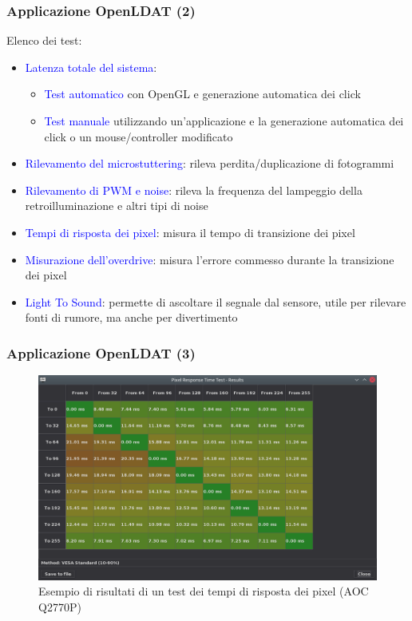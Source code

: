 \documentclass{beamer}
\begin{document}
\begin{frame}[shrink=7]
	\frametitle{Applicazione OpenLDAT (2)}
	Elenco dei test:\begin{itemize}
		\item \textcolor{blue}{Latenza totale del sistema}:\begin{itemize}
			\item \textcolor{blue}{Test automatico} con OpenGL e generazione automatica dei click
			\item \textcolor{blue}{Test manuale} utilizzando un'applicazione e la generazione automatica dei click o un mouse/controller modificato
		\end{itemize}
		\item \textcolor{blue}{Rilevamento del microstuttering}: rileva perdita/duplicazione di fotogrammi
		\item \textcolor{blue}{Rilevamento di PWM e noise}: rileva la frequenza del lampeggio della retroilluminazione e altri tipi di noise
		\item \textcolor{blue}{Tempi di risposta dei pixel}: misura il tempo di transizione dei pixel
		\item \textcolor{blue}{Misurazione dell'overdrive}: misura l'errore commesso durante la transizione dei pixel
		\item \textcolor{blue}{Light To Sound}: permette di ascoltare il segnale dal sensore, utile per rilevare fonti di rumore, ma anche per divertimento
	\end{itemize}
\end{frame}
\begin{frame}
	\frametitle{Applicazione OpenLDAT (3)}
	\begin{figure}
		\includegraphics[width=\textwidth]{Applicazione_files/gui_pixelresponse_results.png}
		\caption*{Esempio di risultati di un test dei tempi di risposta dei pixel (AOC Q2770P)}
	\end{figure}
	
\end{frame}
\end{document}
